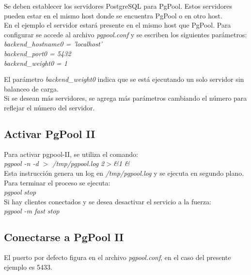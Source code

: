 Se deben establecer los servidores PostgreSQL para PgPool. Estos servidores pueden estar en el mismo host donde se encuentra PgPool o en otro host.\\

En el ejemplo el servidor estará presente en el mismo host que PgPool. Para configurar se accede al archivo \textit{pgpool.conf} y se escriben los siguientes parámetros:\\

\emph{backend\_hostname0 = 'localhost'\\
backend\_port0 = 5432\\
backend\_weight0 = 1\\}

El parámetro \emph{backend\_weight0} indica que se está ejecutando un solo servidor sin balanceo de carga.\\

Si se desean más servidores, se agrega más parámetros cambiando el número para reflejar el número del servidor.\\

\subsection{Activar PgPool II}

Para activar pgpool-II, se utiliza el comando:\\

\emph{pgpool -n -d $>$ /tmp/pgpool.log 2$>$\&1 \&}\\

Esta instrucción genera un log en \textit{/tmp/pgpool.log} y se ejecuta en segundo plano.\\

Para terminar el proceso se ejecuta:\\

\emph{pgpool stop}\\

Si hay clientes conectados y se desea desactivar el servicio a la fuerza:\\

\emph{pgpool -m fast stop}\\

\subsection{Conectarse a PgPool II}

El puerto por defecto figura en el archivo \textit{pgpool.conf}, en el caso del presente ejemplo es 5433.\\

